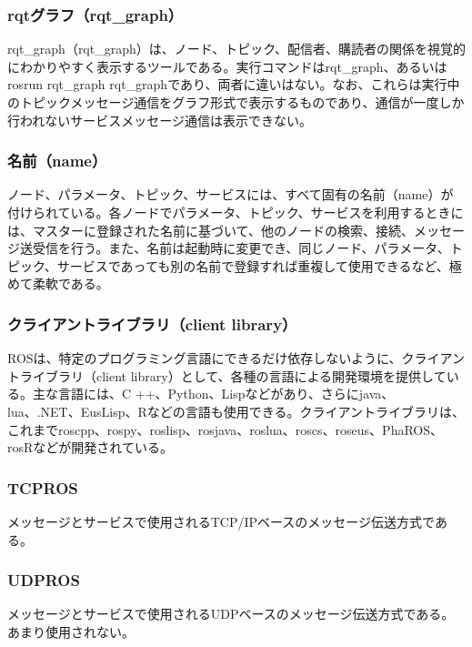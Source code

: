 \subsubsection{rqtグラフ（rqt\_graph）}
rqt\_graph（rqt\_graph）は、ノード、トピック、配信者、購読者の関係を視覚的にわかりやすく表示するツールである。実行コマンドはrqt\_graph、あるいはrosrun rqt\_graph rqt\_graphであり、両者に違いはない。なお、これらは実行中のトピックメッセージ通信をグラフ形式で表示するものであり、通信が一度しか行われないサービスメッセージ通信は表示できない。

\subsubsection{名前（name）}
ノード、パラメータ、トピック、サービスには、すべて固有の名前（name）が付けられている。各ノードでパラメータ、トピック、サービスを利用するときには、マスターに登録された名前に基づいて、他のノードの検索、接続、メッセージ送受信を行う。また、名前は起動時に変更でき、同じノード、パラメータ、トピック、サービスであっても別の名前で登録すれば重複して使用できるなど、極めて柔軟である。

\subsubsection{クライアントライブラリ（client library）}
ROSは、特定のプログラミング言語にできるだけ依存しないように、クライアントライブラリ（client library）として、各種の言語による開発環境を提供している。主な言語には、C ++、Python、Lispなどがあり、さらにjava、lua、.NET、EusLisp、Rなどの言語も使用できる。クライアントライブラリは、これまでroscpp、rospy、roslisp、rosjava、roslua、roscs、roseus、PhaROS、rosRなどが開発されている。

\subsubsection{TCPROS}
メッセージとサービスで使用されるTCP/IPベースのメッセージ伝送方式である。

\subsubsection{UDPROS}
メッセージとサービスで使用されるUDPベースのメッセージ伝送方式である。あまり使用されない。

